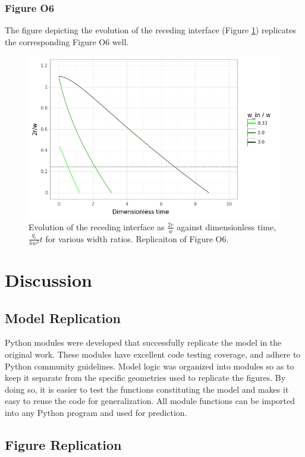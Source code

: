 \subsubsection{Figure O6}

The figure depicting the evolution of the receding interface (Figure \ref{fig6}) replicates
the corresponding Figure O6 well.

\begin{figure}[ht]
  \centering
  \includegraphics[width=0.8\linewidth]{../figures/fig_6.png}
  \caption{Evolution of the receding interface as $\frac{2r}{w}$ against dimensionless time,
  $\frac{q_c}{hw^2}t$ for various width ratios. Replicaiton of Figure O6.}
  \label{fig6}
\end{figure}

\section{Discussion}

\subsection{Model Replication}

Python modules were developed that successfully replicate the model in the original work.
These modules have excellent code testing coverage, and adhere to Python community guidelines.
Model logic was organized into modules so as to keep it separate from the specific geometries
used to replicate the figures. By doing so, it is easier to test the functions constituting
the model and makes it easy to reuse the code for generalization. All module functions can be
imported into any Python program and used for prediction.

\subsection{Figure Replication}

